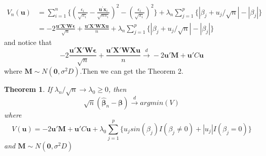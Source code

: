 \documentclass[]{article}
\newtheorem{theorem}{Theorem}
\begin{document}
\begin{align*}
	V_n(\boldsymbol{u}) &= \sum_{i=1}^{n}\{(\frac{\epsilon_i}{\sqrt{\pi_i}} - \frac{\boldsymbol{u}^{'}\boldsymbol{x}_i}{\sqrt{n\pi_i}})^2 - (\frac{\epsilon_i}{\sqrt{\pi_i}})^2\} + \lambda_n\sum_{j=1}^{p}\{|\beta_j + u_j/\sqrt{n}| - |\beta_j|\}\\
	&= -2\frac{\boldsymbol{u}'\boldsymbol{X}'\boldsymbol{W}\boldsymbol{\epsilon}}{\sqrt{n}}+ \frac{\boldsymbol{u}'\boldsymbol{X}'\boldsymbol{W}\boldsymbol{X}\boldsymbol{u}}{n} +
	\lambda_n\sum_{j=1}^{p}\{|\beta_j + u_j/\sqrt{n}| - |\beta_j|\}
\end{align*}
and notice that
$$
-2\frac{\boldsymbol{u}'\boldsymbol{X}'\boldsymbol{W}\boldsymbol{\epsilon}}{\sqrt{n}}+ \frac{\boldsymbol{u}'\boldsymbol{X}'\boldsymbol{W}\boldsymbol{X}\boldsymbol{u}}{n} \xrightarrow{d} -2\boldsymbol{u}'\boldsymbol{M} + \boldsymbol{u}'C\boldsymbol{u}
$$
where $\boldsymbol{M} \sim N(\boldsymbol{0}, \sigma^2D)$.Then we can get the Theorem 2.
\begin{theorem}
	If $\lambda_n/\sqrt{n} \to \lambda_0 \geq 0$, then 
	$$\sqrt{n} (\hat{\boldsymbol{\beta}}_n - \boldsymbol{\beta}) \xrightarrow{d} argmin(V)
	$$ where
	$$
	V(\boldsymbol{u}) = -2\boldsymbol{u}'\boldsymbol{M} + \boldsymbol{u}'C\boldsymbol{u} + \lambda_0\sum_{j=1}^{p}\{u_j sin(\beta_j)I(\beta_j \ne 0) + |u_j|I(\beta_j = 0)\}
	$$
	and $\boldsymbol{M} \sim N(\boldsymbol{0}, \sigma^2D)$
\end{theorem}
\end{document}
